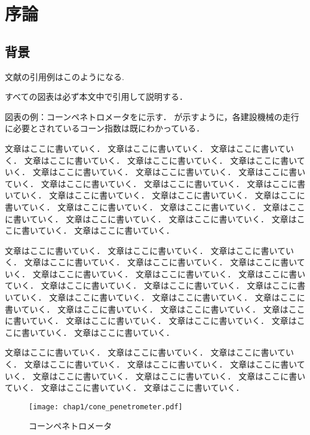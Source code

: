 \documentclass[../main]{subfiles}
\begin{document}
\chapter{序論}
\label{cp:introduction}
\thispagestyle{empty}
\minitoc
\newpage

\section{背景}
\label{sec:intro_background}
文献の引用例はこのようになる\cite{cao2014main1-1-4-3,Kiribayashi2018,kingma2017Adam,tang2021cause,Zacny2010}.

すべての図表は必ず本文中で引用して説明する．

図表の例：コーンペネトロメータをに示す．
が示すように，各建設機械の走行に必要とされているコーン指数は既にわかっている．

文章はここに書いていく．
文章はここに書いていく．
文章はここに書いていく．
文章はここに書いていく．
文章はここに書いていく．
文章はここに書いていく．
文章はここに書いていく．
文章はここに書いていく．
文章はここに書いていく．
文章はここに書いていく．
文章はここに書いていく．
文章はここに書いていく．
文章はここに書いていく．
文章はここに書いていく．
文章はここに書いていく．
文章はここに書いていく．
文章はここに書いていく．
文章はここに書いていく．
文章はここに書いていく．
文章はここに書いていく．
文章はここに書いていく．
文章はここに書いていく．

文章はここに書いていく．
文章はここに書いていく．
文章はここに書いていく．
文章はここに書いていく．
文章はここに書いていく．
文章はここに書いていく．
文章はここに書いていく．
文章はここに書いていく．
文章はここに書いていく．
文章はここに書いていく．
文章はここに書いていく．
文章はここに書いていく．
文章はここに書いていく．
文章はここに書いていく．
文章はここに書いていく．
文章はここに書いていく．
文章はここに書いていく．
文章はここに書いていく．
文章はここに書いていく．
文章はここに書いていく．
文章はここに書いていく．
文章はここに書いていく．

文章はここに書いていく．
文章はここに書いていく．
文章はここに書いていく．
文章はここに書いていく．
文章はここに書いていく．
文章はここに書いていく．
文章はここに書いていく．
文章はここに書いていく．
文章はここに書いていく．
文章はここに書いていく．
文章はここに書いていく．


\begin{figure}[t]
  \centering
  \texttt{[image: chap1/cone\_penetrometer.pdf]}
  \caption{コーンペネトロメータ}
  \label{fig:cone_penetrometer}
\end{figure}
\end{document}
